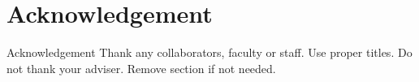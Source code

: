 \documentclass[pdf]{beamer}
\begin{document}
\begin{frame}[fragile]
\begin{columns}
\begin{column}{0.25\textwidth}
\begin{minipage}[t][\textheight]{\linewidth}
\section*{Acknowledgement}
\begin{block}{Acknowledgement}
\small Thank any collaborators, faculty or staff. Use proper titles.  Do not thank your adviser. Remove section if not needed.
\end{block}
\end{minipage}
\end{column}

\end{columns}
\end{frame}
\end{document}
